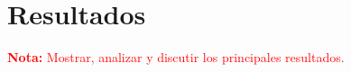 \chapter{Resultados}
\label{c5} %


\textcolor{red}{\textbf{Nota: }Mostrar, analizar y discutir los principales resultados. }